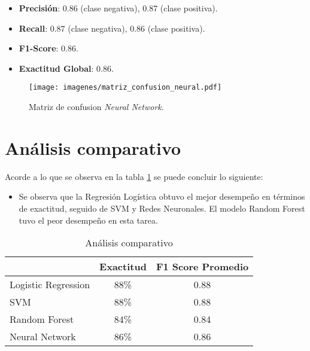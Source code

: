 \documentclass[conference]{IEEEtran}
\begin{document}
\begin{itemize}
\item \textbf{Precisión}: 0.86 (clase negativa), 0.87 (clase positiva).
\item \textbf{Recall}: 0.87 (clase negativa), 0.86 (clase positiva).
\item \textbf{F1-Score}: 0.86.
\item \textbf{Exactitud Global}: 0.86.
\end{itemize}

\begin{figure}[h]
    \centering
    \texttt{[image: imagenes/matriz\_confusion\_neural.pdf]}
    \caption{Matriz de confusion \textit{Neural Network}.}
    \label{fig:neural}
\end{figure}

\FloatBarrier



\section{Análisis comparativo}

Acorde a lo que se observa en la tabla \ref{tab:comparacion} se puede concluir lo siguiente:
\begin{itemize}
\item Se observa que la Regresión Logística obtuvo el mejor desempeño en términos de exactitud, seguido de SVM y Redes Neuronales. El modelo Random Forest tuvo el peor desempeño en esta tarea.
\end{itemize}


\begin{table}[h!]
    \centering
    \begin{tabular}{ | l | c | c | }
    \rowcolor[HTML]{FFCCC9} 
    \hline
        \multicolumn{1}{c}{\cellcolor[HTML]{FFCCC9}\textbf{Modelo}} & \textbf{Exactitud} & \textbf{F1 Score Promedio} \\ \hline
        Logistic Regression & 88\% & 0.88 \\ \hline
        SVM & 88\% & 0.88 \\ \hline
        Random Forest & 84\% & 0.84 \\ \hline
        Neural Network & 86\% & 0.86 \\ \hline
    \end{tabular}
    \caption{Análisis comparativo}
    \label{tab:comparacion}
\end{table}

\FloatBarrier
\end{document}
